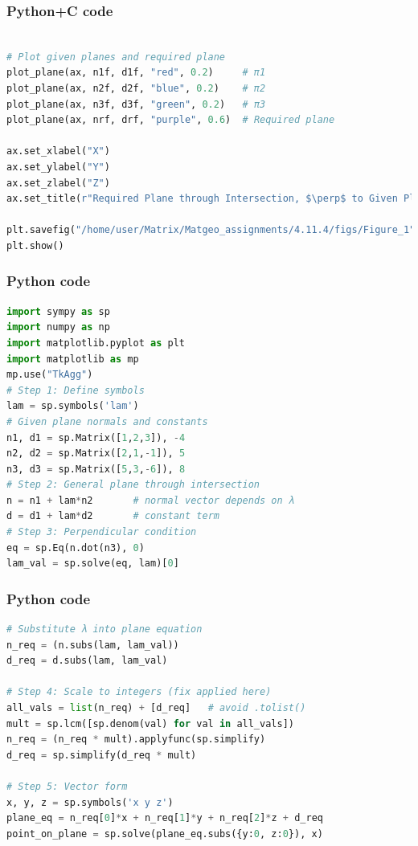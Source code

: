 \documentclass{beamer}
\begin{document}
\begin{frame}[fragile]
    \frametitle{Python+C code}

    \begin{lstlisting}[language=Python]

# Plot given planes and required plane
plot_plane(ax, n1f, d1f, "red", 0.2)     # π1
plot_plane(ax, n2f, d2f, "blue", 0.2)    # π2
plot_plane(ax, n3f, d3f, "green", 0.2)   # π3
plot_plane(ax, nrf, drf, "purple", 0.6)  # Required plane

ax.set_xlabel("X")
ax.set_ylabel("Y")
ax.set_zlabel("Z")
ax.set_title(r"Required Plane through Intersection, $\perp$ to Given Plane")

plt.savefig("/home/user/Matrix/Matgeo_assignments/4.11.4/figs/Figure_1", dpi=300, bbox_inches="tight")
plt.show()
    \end{lstlisting}
    
\end{frame}

\begin{frame}[fragile]
    \frametitle{Python code}

    \begin{lstlisting}[language=Python]
import sympy as sp
import numpy as np
import matplotlib.pyplot as plt
import matplotlib as mp
mp.use("TkAgg")
# Step 1: Define symbols
lam = sp.symbols('lam')
# Given plane normals and constants
n1, d1 = sp.Matrix([1,2,3]), -4
n2, d2 = sp.Matrix([2,1,-1]), 5
n3, d3 = sp.Matrix([5,3,-6]), 8
# Step 2: General plane through intersection
n = n1 + lam*n2       # normal vector depends on λ
d = d1 + lam*d2       # constant term
# Step 3: Perpendicular condition
eq = sp.Eq(n.dot(n3), 0)
lam_val = sp.solve(eq, lam)[0]
    \end{lstlisting}
    
\end{frame}

\begin{frame}[fragile]
    \frametitle{Python code}

    \begin{lstlisting}[language=Python]
# Substitute λ into plane equation
n_req = (n.subs(lam, lam_val))
d_req = d.subs(lam, lam_val)

# Step 4: Scale to integers (fix applied here)
all_vals = list(n_req) + [d_req]   # avoid .tolist()
mult = sp.lcm([sp.denom(val) for val in all_vals])
n_req = (n_req * mult).applyfunc(sp.simplify)
d_req = sp.simplify(d_req * mult)

# Step 5: Vector form
x, y, z = sp.symbols('x y z')
plane_eq = n_req[0]*x + n_req[1]*y + n_req[2]*z + d_req
point_on_plane = sp.solve(plane_eq.subs({y:0, z:0}), x)
    \end{lstlisting}
    
\end{frame}
\end{document}
